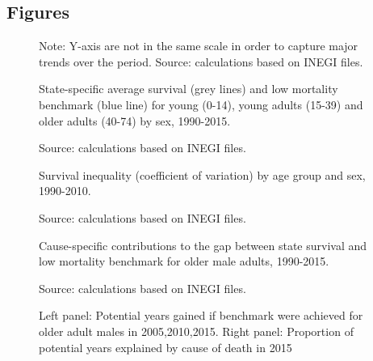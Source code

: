 \documentclass{bmcart}
\begin{document}
\begin{backmatter}

\section*{Figures}

\begin{figure}[h!]
\centering
\caption{State-specific average survival (grey lines) and low mortality benchmark (blue line) for young (0-14), young adults (15-39) and older adults (40-74) by sex, 1990-2015.}
\label{Fig1}


Note: Y-axis are not in the same scale in order to capture major trends over the period. Source: calculations based on INEGI files. 
\end{figure}



\begin{figure}[h!]
\centering
\caption{Survival inequality (coefficient of variation) by age group and sex, 1990-2010.}
\label{Fig2}

Source: calculations based on INEGI files. 
\end{figure}



\begin{figure}[h!]
\centering
\caption{Cause-specific contributions to the gap between state survival and low mortality benchmark for older male adults, 1990-2015.}
\label{Fig3}


Source: calculations based on INEGI files. 
\end{figure}


\begin{figure}[h!]
\centering
\caption{Left panel: Potential years gained if benchmark were achieved for older adult males in 2005,2010,2015. Right panel: Proportion of potential years explained by cause of death in 2015 }
\label{Fig4}

Source: calculations based on INEGI files. 
\end{figure}



\end{backmatter}
\end{document}

